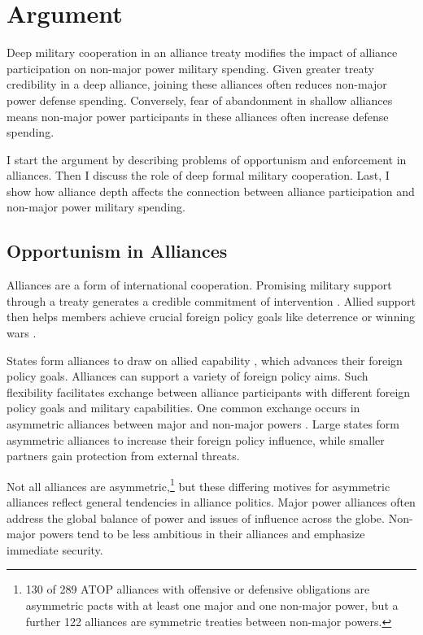 \documentclass[12pt]{article}
\begin{document}
\section{Argument}

Deep military cooperation in an alliance treaty modifies the impact of alliance participation on non-major power military spending.
Given greater treaty credibility in a deep alliance, joining these alliances often reduces non-major power defense spending.
Conversely, fear of abandonment in shallow alliances means non-major power participants in these alliances often increase defense spending.  


I start the argument by describing problems of opportunism and enforcement in alliances. 
Then I discuss the role of deep formal military cooperation. 
Last, I show how alliance depth affects the connection between alliance participation and non-major power military spending. 


\subsection{Opportunism in Alliances}

Alliances are a form of international cooperation. 
Promising military support through a treaty generates a credible commitment of intervention \citep{Fearon1997, Morrow2000}. 
Allied support then helps members achieve crucial foreign policy goals like deterrence or winning wars \citep{Walt1990, Snyder1997}. 


States form alliances to draw on allied capability \citep{FordhamPoast2014}, which advances their foreign policy goals.
Alliances can support a variety of foreign policy aims.
Such flexibility facilitates exchange between alliance participants with different foreign policy goals and military capabilities. 
One common exchange occurs in asymmetric alliances between major and non-major powers \citep{Morrow1991}. 
Large states form asymmetric alliances to increase their foreign policy influence, while smaller partners gain protection from external threats. 


Not all alliances are asymmetric,\footnote{130 of 289 ATOP alliances with offensive or defensive obligations are asymmetric pacts with at least one major and one non-major power, but a further 122 alliances are symmetric treaties between non-major powers.} but these differing motives for asymmetric alliances reflect general tendencies in alliance politics. 
Major power alliances often address the global balance of power and issues of influence across the globe. 
Non-major powers tend to be less ambitious in their alliances and emphasize immediate security. 
\end{document}
